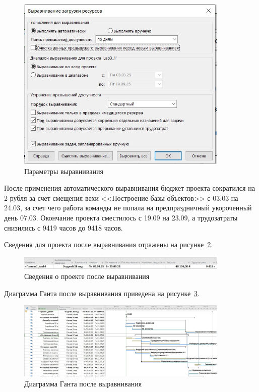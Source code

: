\begin{figure}[H]
	\centering
	\includegraphics[width=0.9\textwidth]{img/task1/screen1.jpg}
	\caption{Параметры выравнивания}
	\label{fig:screen1}
\end{figure}

После применения автоматического выравнивания бюджет проекта сократился на 2 рубля за счет смещения вехи <<Построение базы объектов>> с 03.03 на 24.03, за счет чего работа команды не попала на предпраздничный укороченный день 07.03.
Окончание проекта сместилось с 19.09 на 23.09, а трудозатраты снизились с 9419 часов до 9418 часов.

Сведения для проекта после выравнивания отражены на рисунке~\ref{fig:screen2}.

\begin{figure}[H]
	\centering
	\includegraphics[width=0.9\textwidth]{img/task1/screen2.jpg}
	\caption{Сведения о проекте после выравнивания}
	\label{fig:screen2}
\end{figure}

Диаграмма Ганта после выравнивания приведена на рисунке~\ref{fig:screen3}.

\begin{figure}[H]
	\centering
	\includegraphics[width=0.9\textwidth]{img/task1/screen3.jpg}
	\caption{Диаграмма Ганта после выравнивания}
	\label{fig:screen3}
\end{figure}

